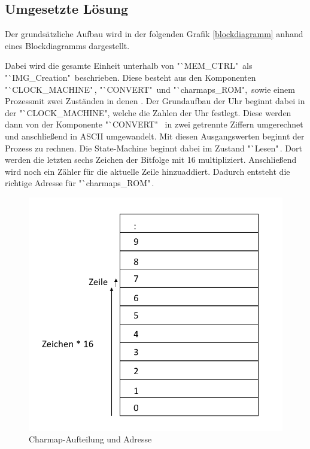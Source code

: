 \documentclass[12pt,a4paper,bibliography=totoc,listof=totoc]{scrartcl}
\begin{document}
\subsection{Umgesetzte Lösung}
Der grundsätzliche Aufbau wird in der folgenden Grafik \ref{blockdiagramm} anhand eines Blockdiagramms dargestellt.

Dabei wird die gesamte Einheit unterhalb von "`MEM\_CTRL" \,als "`IMG\_Creation" \,\newline beschrieben. Diese besteht aus den Komponenten \,
"`CLOCK\_MACHINE"\,,
"`CONVERT" \,und "`charmaps\_ROM",\, sowie einem Prozessmit zwei Zuständen in denen . Der Grundaufbau der Uhr beginnt dabei in der 
"`CLOCK\_MACHINE", welche die Zahlen der Uhr festlegt. Diese werden dann von der Komponente "`CONVERT" \, in zwei getrennte Ziffern umgerechnet 
und anschließend in ASCII umgewandelt. Mit diesen 
Ausgangswerten beginnt der Prozess zu rechnen. Die State-Machine beginnt dabei im Zustand "`Lesen"\,. Dort werden die letzten sechs Zeichen der 
Bitfolge mit 16 multipliziert. Anschließend 
wird noch ein Zähler für die aktuelle Zeile hinzuaddiert. Dadurch entsteht die richtige Adresse für "`charmaps\_ROM"\,. 

\begin{figure}[htbp]
	\centering
	\includegraphics[scale = 0.4]{pics/Aufbaucharmaps}
	\caption{Charmap-Aufteilung und Adresse}
	\label{charmaps}
\end{figure} 
 
\end{document}
